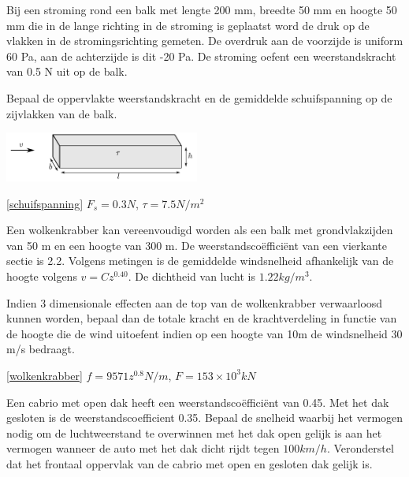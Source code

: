 \begin{toepassing}
	\label{schuifspanning}
Bij een stroming rond een balk met lengte 200 mm, breedte 50 mm en hoogte 50 mm die in de lange richting in de stroming is geplaatst word de druk op de vlakken in de stromingsrichting gemeten. De overdruk aan de voorzijde is uniform 60 Pa, aan de achterzijde is dit -20 Pa. De stroming oefent een weerstandskracht van 0.5 N uit op de balk.

Bepaal de oppervlakte weerstandskracht en de gemiddelde schuifspanning op de zijvlakken van de balk.

	\centering
	\includegraphics[width=0.48\textwidth]{fig/uitwendige_stroming/schuifspanning.pdf}
\end{toepassing}
\begin{antwoord}{\ref{schuifspanning}}
	$F_s = 0.3\unit{N}$, $\tau = 7.5\unit{N/m^2}$
\end{antwoord}
\begin{toepassing}[*]
	\label{wolkenkrabber}
Een wolkenkrabber kan vereenvoudigd worden als een balk met grondvlakzijden van 50 m en een hoogte van 300 m. De weerstandscoëfficiënt van een vierkante sectie is 2.2. Volgens metingen is de gemiddelde windsnelheid afhankelijk van de hoogte volgens $v = C z^{0.40}$. De dichtheid van lucht is $1.22\unit{kg/m^3}$.

Indien 3 dimensionale effecten aan de top van de wolkenkrabber verwaarloosd kunnen worden, bepaal dan de totale kracht en de krachtverdeling in functie van de hoogte die de wind uitoefent indien op een hoogte van 10m de windsnelheid 30 m/s bedraagt.
\end{toepassing}
\begin{antwoord}{\ref{wolkenkrabber}}
	$f = 9571 z^{0.8} \unit{N/m}$, $F = 153 \times 10^3\unit{kN}$
\end{antwoord}
\begin{toepassing}
	\label{cabrio}
Een cabrio met open dak heeft een weerstandscoëfficiënt van 0.45. Met het dak gesloten is de weerstandscoefficient 0.35.
Bepaal de snelheid waarbij het vermogen nodig om de luchtweerstand te overwinnen met het dak open gelijk is aan het vermogen wanneer de auto met het dak dicht rijdt tegen $100\unit{km/h}$. Veronderstel dat het frontaal oppervlak van de cabrio met open en gesloten dak gelijk is.
\end{toepassing}
